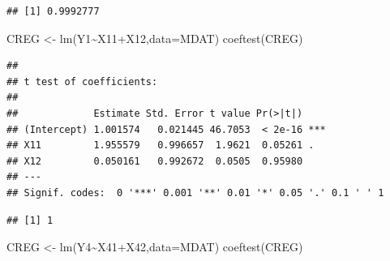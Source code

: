 \documentclass[
]{book}
\newenvironment{Shaded}{\begin{snugshade}}{\end{snugshade}}
\newcommand{\AttributeTok}[1]{\textcolor[rgb]{0.77,0.63,0.00}{#1}}
\newcommand{\CommentTok}[1]{\textcolor[rgb]{0.56,0.35,0.01}{\textit{#1}}}
\newcommand{\FunctionTok}[1]{\textcolor[rgb]{0.00,0.00,0.00}{#1}}
\newcommand{\NormalTok}[1]{#1}
\newcommand{\OtherTok}[1]{\textcolor[rgb]{0.56,0.35,0.01}{#1}}
\newcommand{\SpecialCharTok}[1]{\textcolor[rgb]{0.00,0.00,0.00}{#1}}
\begin{document}
\begin{Shaded}
\end{Shaded}

\begin{verbatim}
## [1] 0.9992777
\end{verbatim}

\begin{Shaded}
\begin{Highlighting}[]
\NormalTok{CREG }\OtherTok{\textless{}{-}} \FunctionTok{lm}\NormalTok{(Y1}\SpecialCharTok{\textasciitilde{}}\NormalTok{X11}\SpecialCharTok{+}\NormalTok{X12,}\AttributeTok{data=}\NormalTok{MDAT)}
\FunctionTok{coeftest}\NormalTok{(CREG)}
\end{Highlighting}
\end{Shaded}

\begin{verbatim}
## 
## t test of coefficients:
## 
##             Estimate Std. Error t value Pr(>|t|)    
## (Intercept) 1.001574   0.021445 46.7053  < 2e-16 ***
## X11         1.955579   0.996657  1.9621  0.05261 .  
## X12         0.050161   0.992672  0.0505  0.95980    
## ---
## Signif. codes:  0 '***' 0.001 '**' 0.01 '*' 0.05 '.' 0.1 ' ' 1
\end{verbatim}

\begin{Shaded}
\end{Shaded}

\begin{verbatim}
## [1] 1
\end{verbatim}

\begin{Shaded}
\begin{Highlighting}[]
\NormalTok{CREG }\OtherTok{\textless{}{-}} \FunctionTok{lm}\NormalTok{(Y4}\SpecialCharTok{\textasciitilde{}}\NormalTok{X41}\SpecialCharTok{+}\NormalTok{X42,}\AttributeTok{data=}\NormalTok{MDAT)}
\FunctionTok{coeftest}\NormalTok{(CREG)}
\end{Highlighting}
\end{Shaded}
\end{document}
